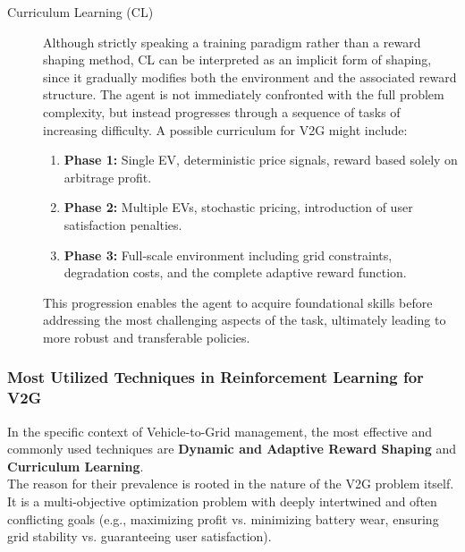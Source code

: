 \begin{description}
    \item[Curriculum Learning (CL)] 
    \noindent
    Although strictly speaking a training paradigm rather than a reward shaping method, CL can be interpreted as an implicit form of shaping, since it gradually modifies both the environment and the associated reward structure. 
    The agent is not immediately confronted with the full problem complexity, but instead progresses through a sequence of tasks of increasing difficulty. 
    A possible curriculum for V2G might include:
    \begin{enumerate}
        \item \textbf{Phase 1:} Single EV, deterministic price signals, reward based solely on arbitrage profit. 
        \item \textbf{Phase 2:} Multiple EVs, stochastic pricing, introduction of user satisfaction penalties. 
        \item \textbf{Phase 3:} Full-scale environment including grid constraints, degradation costs, and the complete adaptive reward function. 
    \end{enumerate}
    This progression enables the agent to acquire foundational skills before addressing the most challenging aspects of the task, ultimately leading to more robust and transferable policies. 
\end{description}


\subsubsection{Most Utilized Techniques in Reinforcement Learning for V2G}
In the specific context of Vehicle-to-Grid management, the most effective and commonly used techniques are \textbf{Dynamic and Adaptive Reward Shaping} and \textbf{Curriculum Learning}.
\noindent
\\
The reason for their prevalence is rooted in the nature of the V2G problem itself. It is a multi-objective optimization problem with deeply intertwined and often conflicting goals (e.g., maximizing profit vs. minimizing battery wear, ensuring grid stability vs. guaranteeing user satisfaction).

